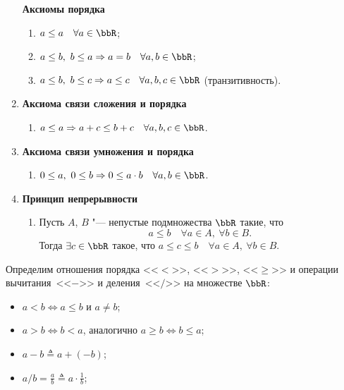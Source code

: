 \begin{enumerate}[label=\Roman*.]
\textbf{Аксиомы порядка} 
\begin{enumerate}[resume, label=\arabic*.]
\item 
$ a \le a\quad \forall a \in \bbR$;
\item
$ a\le b,\ b\le a \Rightarrow a=b \quad \forall a,b\in\bbR$;
\item
$a\le b,\ b\le c \Rightarrow a\le c\quad \forall a,b,c\in \bbR$ (транзитивность).
\end{enumerate}
\item
\textbf{Аксиома связи сложения и порядка}
\begin{enumerate}[resume, label=\arabic*.]
\item 
$ a \le a\Rightarrow a + c \le b + c\quad \forall a,b,c \in \bbR$.
\end{enumerate}
\item
\textbf{Аксиома связи умножения и порядка}
\begin{enumerate}[resume, label=\arabic*.]
\item 
$ 0 \le a,\ 0\le b\Rightarrow 0 \le a\cdot b\quad \forall a,b \in \bbR$.
\end{enumerate}
\item
\textbf{Принцип непрерывности}
\begin{enumerate}[resume, label=\arabic*.]
\item 
Пусть $A$, $B$ "--- непустые подмножества $\bbR$ такие, что
$$
a\le b\quad \forall a \in A, \  \forall b \in B.
$$
Тогда $\exists c \in \bbR$ такое, что $a\le c\le b\quad \forall a \in A,\ \forall b\in B.$
\end{enumerate}
\end{enumerate}
\enlargethispage{\baselineskip}
\begin{defn}
Определим отношения порядка <<$<$>>, <<$>$>>, <<$\ge$>> и операции вычитания~<<$-$>> и деления~<<$/$>> на множестве $\bbR$:
\begin{itemize}[noitemsep,  topsep=0pt]
\item 
$a < b \Longleftrightarrow a \le b \text{ и } a\neq b$;
\item
$a > b \Longleftrightarrow b < a$, аналогично $a \ge b \Longleftrightarrow b \le a$;
\item
$a - b \triangleq a + (-b)$;
\item
$a / b =  \frac{a}{b} \triangleq a \cdot \frac{1}{b}$; 
\end{itemize}
\end{defn}


